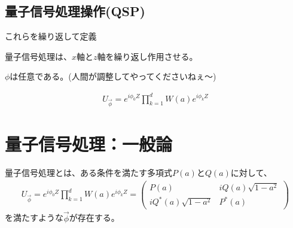 \documentclass[platex,dvipdfmx]{jlreq}			%
\begin{document}
\subsection{量子信号処理操作(QSP)}
これらを繰り返して定義

量子信号処理は、$x$軸と$z$軸を繰り返し作用させる。

$\phi$は任意である。(人間が調整してやってくださいねぇ〜)


\begin{align}
    U_{\vec{\phi}} = e^{i \phi_0 Z} \prod_{k = 1}^{d} W(a) e^{i \phi_k Z}
\end{align}

\section{量子信号処理：一般論}
量子信号処理とは、ある条件を満たす多項式$P(a)$と$Q(a)$に対して、
\begin{align}
    U_{\vec{\phi}} = e^{i\phi_0 Z} \prod^d_{k = 1} W(a)e^{i\phi_kZ}
    = \begin{pmatrix}
    P(a) & iQ(a)\sqrt{1 - a^2} \\
    iQ^*(a)\sqrt{1 - a^2} & P^*(a)
    \end{pmatrix}
\end{align}
を満たすような$\vec{\phi}$が存在する。

\end{document}
